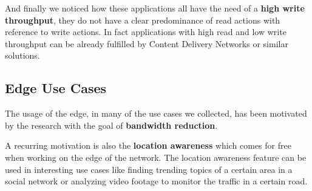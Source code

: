 And finally we noticed how these applications all have the need of a \textbf{high write throughput}, they do not have a clear predominance of read actions with reference to write actions. In fact applications with high read and low write throughput can be already fulfilled by Content Delivery Networks or similar solutions.


\subsection{Edge Use Cases}

The usage of the edge, in many of the use cases we collected, has been motivated by the research with the goal of \textbf{bandwidth reduction}.

A recurring motivation is also the \textbf{location awareness} which comes for free when working on the edge of the network. The location awareness feature can be used in interesting use cases like finding trending topics of a certain area in a social network or analyzing video footage to monitor the traffic in a certain road.
